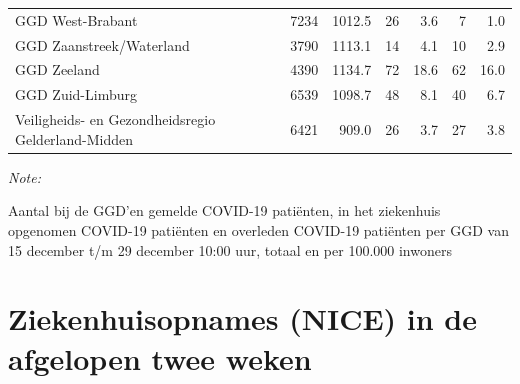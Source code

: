 \documentclass[
  english,
  man,floatsintext]{apa6}
\begin{document}
\begin{table}
\begin{threeparttable}
\begin{tabular}{lrrrrrr}
GGD West-Brabant & 7234 & 1012.5 & 26 & 3.6 & 7 & 1.0\\
GGD Zaanstreek/Waterland & 3790 & 1113.1 & 14 & 4.1 & 10 & 2.9\\
GGD Zeeland & 4390 & 1134.7 & 72 & 18.6 & 62 & 16.0\\
GGD Zuid-Limburg & 6539 & 1098.7 & 48 & 8.1 & 40 & 6.7\\
Veiligheids- en Gezondheidsregio Gelderland-Midden & 6421 & 909.0 & 26 & 3.7 & 27 & 3.8\\
\bottomrule
\end{tabular}
\begin{tablenotes}
\item \textit{Note: } 
\item Aantal bij de GGD’en gemelde COVID-19 patiënten, in het ziekenhuis opgenomen COVID-19 patiënten en overleden COVID-19 patiënten per GGD van 15 december t/m 29 december 10:00 uur, totaal en per 100.000 inwoners
\end{tablenotes}
\end{threeparttable}
\endgroup{}
\end{table}

\newpage

\hypertarget{ziekenhuisopnames-nice-in-de-afgelopen-twee-weken}{%
\section{Ziekenhuisopnames (NICE) in de afgelopen twee weken}\label{ziekenhuisopnames-nice-in-de-afgelopen-twee-weken}}
\end{document}
